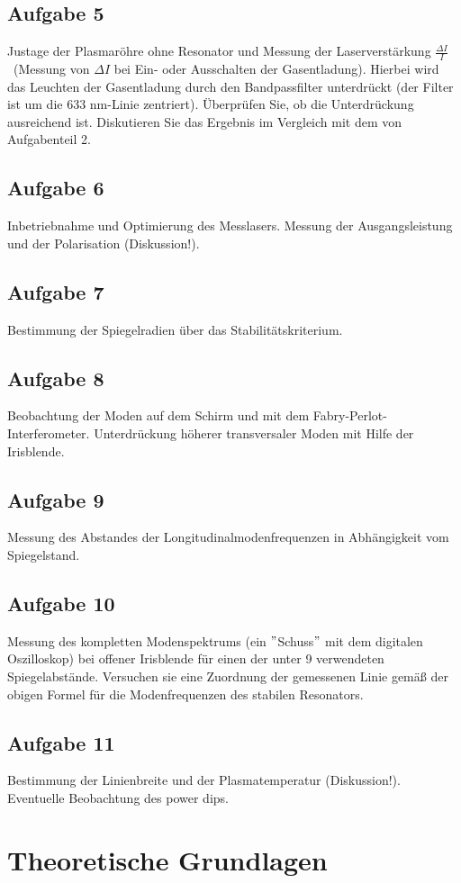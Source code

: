 \documentclass[a4paper, parskip=half]{scrartcl}
\begin{document}
\subsection*{Aufgabe 5}
Justage der Plasmaröhre ohne Resonator und Messung der Laserverstärkung \(\frac{\Delta I}{I}\)\ (Messung von \(\Delta I\) bei Ein- oder Ausschalten der Gasentladung). Hierbei wird das 
Leuchten der Gasentladung durch den Bandpassfilter unterdrückt (der Filter ist um die 633 nm-Linie zentriert). Überprüfen Sie, ob die Unterdrückung ausreichend ist. 
Diskutieren Sie das Ergebnis im Vergleich mit dem von Aufgabenteil 2. 

\subsection*{Aufgabe 6}
Inbetriebnahme und Optimierung des Messlasers. Messung der Ausgangsleistung und der Polarisation (Diskussion!). 

\subsection*{Aufgabe 7}
Bestimmung der Spiegelradien über das Stabilitätskriterium.

\subsection*{Aufgabe 8}
Beobachtung der Moden auf dem Schirm und mit dem Fabry-Perlot-Interferometer. Unterdrückung höherer transversaler Moden mit Hilfe der Irisblende.

\subsection*{Aufgabe 9}
Messung des Abstandes der Longitudinalmodenfrequenzen  in Abhängigkeit vom Spiegelstand.

\subsection*{Aufgabe 10}
Messung des kompletten Modenspektrums (ein \("\)Schuss\("\) mit dem digitalen Oszilloskop) bei offener Irisblende für einen der unter 9 verwendeten Spiegelabstände. Versuchen sie eine Zuordnung der gemessenen Linie gemäß der obigen Formel für die Modenfrequenzen des stabilen Resonators.

\subsection*{Aufgabe 11}
Bestimmung der Linienbreite und der Plasmatemperatur (Diskussion!). Eventuelle Beobachtung des power dips.

\section{Theoretische Grundlagen}
\end{document}

